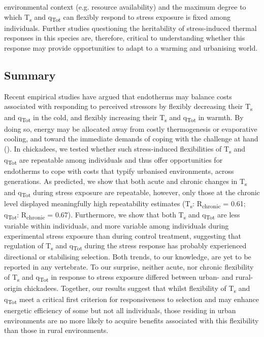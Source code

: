 \documentclass[12pt]{article}
\begin{document}
environmental context (e.g. resource availability) and the maximum degree to which T\textsubscript{s} and q\textsubscript{Tot} can flexibly respond to stress exposure is fixed among individuals. Further studies questioning the heritability of stress-induced thermal responses in this species are, therefore, critical to understanding whether this response may provide opportunities to adapt to a warming and urbanising world.\vspace{0.5cm}

\subsection{Summary}
\vspace{0.5cm}

\noindent Recent empirical studies have argued that endotherms may balance costs associated with responding to perceived stressors by flexibly decreasing their T\textsubscript{s} and q\textsubscript{Tot} in the cold, and flexibly increasing their T\textsubscript{s} and q\textsubscript{Tot} in warmth. By doing so, energy may be allocated away from costly thermogenesis or evaporative cooling, and toward the immediate demands of coping with the challenge at hand (\citealt{robertson_2020a}). In chickadees, we tested whether such stress-induced flexibilities of T\textsubscript{s} and q\textsubscript{Tot} are repeatable among individuals and thus offer opportunities for endotherms to cope with costs that typify urbanised environments, across generations. As predicted, we show that both acute and chronic changes in T\textsubscript{s} and q\textsubscript{Tot} during stress exposure are repeatable, however, only those at the chronic level displayed meaningfully high repeatability estimates (T\textsubscript{s}: R\textsubscript{chronic} = 0.61; q\textsubscript{Tot}: R\textsubscript{chronic} = 0.67). Furthermore, we show that both T\textsubscript{s} and q\textsubscript{Tot} are less variable within individuals, and more variable among individuals during experimental stress exposure than during control treatment, suggesting that regulation of T\textsubscript{s} and q\textsubscript{Tot} during the stress response has probably experienced directional or stabilising selection. Both trends, to our knowledge, are yet to be reported in any vertebrate. To our surprise, neither acute, nor chronic flexibility of T\textsubscript{s} and q\textsubscript{Tot} in response to stress exposure differed between urban- and rural-origin chickadees. Together, our results suggest that whilst flexibility of T\textsubscript{s} and q\textsubscript{Tot} meet a critical first criterion for responsiveness to selection and may enhance energetic efficiency of some but not all individuals, those residing in urban environments are no more likely to acquire benefits associated with this flexibility than those in rural environments.
\end{document}
